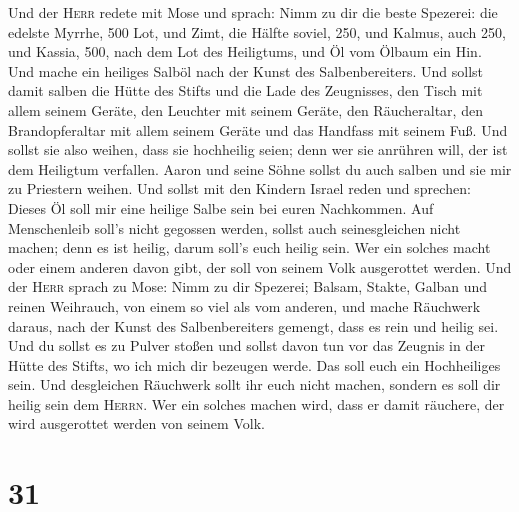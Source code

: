  Und der \textsc{Herr} redete mit Mose und sprach:
 Nimm zu dir die beste Spezerei: die edelste Myrrhe, 500
Lot, und Zimt, die Hälfte soviel, 250, und Kalmus, auch 250,
 und Kassia, 500, nach dem Lot des Heiligtums, und Öl vom
Ölbaum ein Hin.  Und mache ein heiliges Salböl nach der
Kunst des Salbenbereiters.  Und sollst damit salben die
Hütte des Stifts und die Lade des Zeugnisses,  den Tisch
mit allem seinem Geräte, den Leuchter mit seinem Geräte, den
Räucheraltar,  den Brandopferaltar mit allem seinem
Geräte und das Handfass mit seinem Fuß.  Und sollst sie
also weihen, dass sie hochheilig seien; denn wer sie anrühren will, der
ist dem Heiligtum verfallen.  Aaron und seine Söhne
sollst du auch salben und sie mir zu Priestern weihen. 
Und sollst mit den Kindern Israel reden und sprechen: Dieses Öl soll mir
eine heilige Salbe sein bei euren Nachkommen.  Auf
Menschenleib soll's nicht gegossen werden, sollst auch seinesgleichen
nicht machen; denn es ist heilig, darum soll's euch heilig sein.
 Wer ein solches macht oder einem anderen davon gibt, der
soll von seinem Volk ausgerottet werden.  Und der
\textsc{Herr} sprach zu Mose: Nimm zu dir Spezerei; Balsam, Stakte,
Galban und reinen Weihrauch, von einem so viel als vom anderen,
 und mache Räuchwerk daraus, nach der Kunst des
Salbenbereiters gemengt, dass es rein und heilig sei. 
Und du sollst es zu Pulver stoßen und sollst davon tun vor das Zeugnis
in der Hütte des Stifts, wo ich mich dir bezeugen werde. Das soll euch
ein Hochheiliges sein.  Und desgleichen Räuchwerk sollt
ihr euch nicht machen, sondern es soll dir heilig sein dem
\textsc{Herrn}.  Wer ein solches machen wird, dass er
damit räuchere, der wird ausgerottet werden von seinem Volk.

\hypertarget{section-30}{%
\section{31}\label{section-30}}

